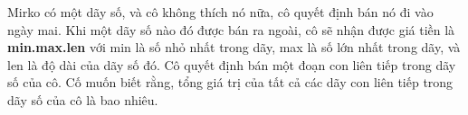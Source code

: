Mirko có một dãy số, và cô không thích nó nữa, cô quyết định bán nó đi vào ngày mai. Khi một dãy số nào đó được bán ra ngoài, cô sẽ nhận được giá tiền là   \textbf{    min.max.len   }   với min là số nhỏ nhất trong dãy, max là số lớn nhất trong dãy, và len là độ dài của dãy số đó. Cô quyết định bán một đoạn con liên tiếp trong dãy số của cô. Cố muốn biết rằng, tổng giá trị của tất cả các dãy con liên tiếp trong dãy số của cô là bao nhiêu.